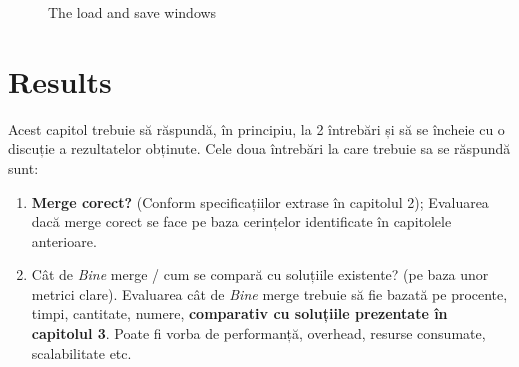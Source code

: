 \documentclass[12pt,a4paper]{report}
\begin{document}
\begin{figure}[!ht]
	\centering
	\qquad
	\qquad
	\caption{The load and save windows}
	\label{fig:saveload}
\end{figure}

\newpage
\section{Results}
Acest capitol trebuie să răspundă, în principiu, la 2 întrebări și să se încheie cu o discuție a rezultatelor obținute. Cele doua întrebări la care trebuie sa se răspundă sunt:
\begin{enumerate}
	\item  \textbf{Merge corect?} (Conform specificațiilor extrase în capitolul 2); 
Evaluarea dacă merge corect se face pe baza cerințelor identificate în capitolele anterioare. 

	\item Cât de \textit{Bine} merge / cum se compară cu soluțiile existente? (pe baza unor metrici clare). 
Evaluarea cât de \textit{Bine} merge trebuie să fie bazată pe procente, timpi, cantitate, numere, \textbf{comparativ cu soluțiile prezentate în capitolul 3}. Poate fi vorba de performanță, overhead, resurse consumate, scalabilitate etc. 
\end{enumerate}
\end{document}
